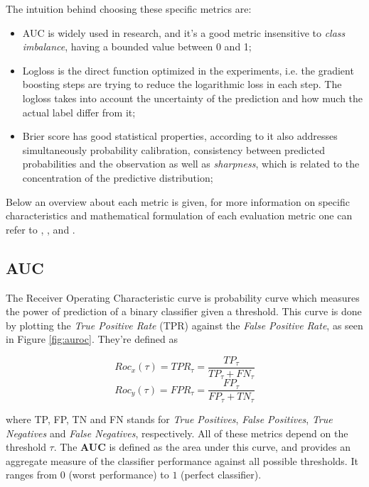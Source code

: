 The intuition behind choosing these specific metrics are:

\begin{itemize}
    \item AUC is widely used in research, and it's a good metric insensitive to \textit{class imbalance}, having a bounded value between 0 and 1;
    \item Logloss is the direct function optimized in the experiments, i.e. the gradient boosting steps are trying to reduce the logarithmic loss in each step. The logloss takes into account the uncertainty of the prediction and how much the actual label differ from it;
    \item Brier score has good statistical properties, according to \cite{rufibach2010use} it also addresses simultaneously probability calibration, consistency between predicted probabilities and the observation as well as \textit{sharpness}, which is related to the concentration of the predictive distribution;
\end{itemize}

Below an overview about each metric is given, for more information on specific characteristics and mathematical formulation of each evaluation metric one can refer to \cite{BROWN200624}, \cite{rufibach2010use}, \cite{kuhn2013applied} and \cite{hastie2009elements}.

\subsection{AUC}

The Receiver Operating Characteristic curve is probability curve which measures the power of prediction of a binary classifier given a threshold. This curve is done by plotting the \textit{True Positive Rate} (TPR) against the \textit{False Positive Rate}, as seen in Figure \ref{fig:auroc}. They're defined as

$$Roc_x(\tau) = TPR_{\tau} = \frac{TP_{\tau}}{TP_{\tau} + FN_{\tau}}$$
$$Roc_y(\tau) = FPR_{\tau} = \frac{FP_{\tau}}{FP_{\tau} + TN_{\tau}}$$

where TP, FP, TN and FN stands for \textit{True Positives}, \textit{False Positives}, \textit{True Negatives} and \textit{False Negatives}, respectively. All of these metrics depend on the threshold $\tau$. The \textbf{AUC} is defined as the area under this curve, and provides an aggregate measure of the classifier performance against all possible thresholds. It ranges from $0$ (worst performance) to $1$ (perfect classifier).

